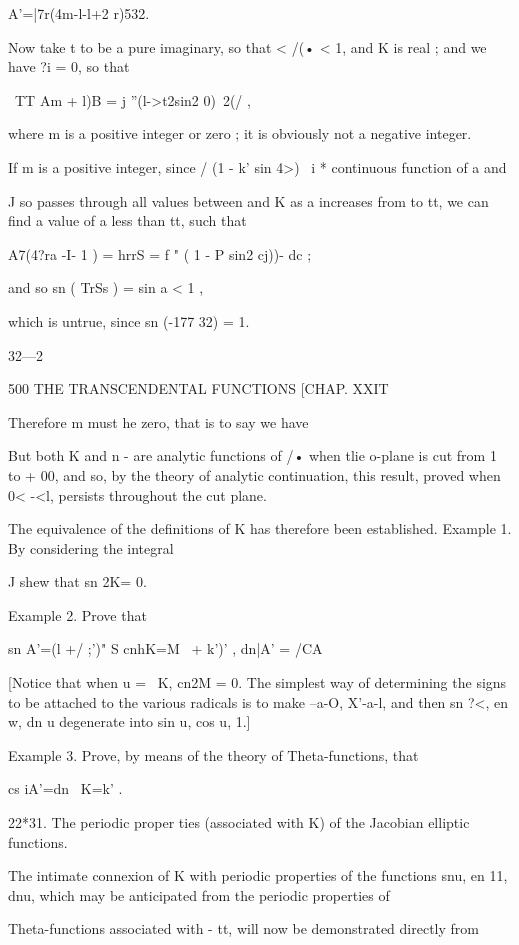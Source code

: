 A'=|7r(4m-l-l+2 r)532.

Now take t to be a pure imaginary, so that < /(• < 1, and K is real ;
and we have ?i = 0, so that

\ TT Am + l)B = j ''(l->t2sin2 0)~2(/ ,

where m is a positive integer or zero ; it is obviously not a negative
integer.

If m is a positive integer, since / (1 - k' sin 4>)~ i * continuous
function of a and

J so passes through all values between and K as a increases from to
tt, we can find a value of a less than tt, such that

A7(4?ra -I- 1 ) = hrrS = f " ( 1 - P sin2 cj))- dc ;

and so sn ( TrSs ) = sin a < 1 ,

which is untrue, since sn (-177 32) = 1.

32—2

500 THE TRANSCENDENTAL FUNCTIONS [CHAP. XXIT

Therefore m must he zero, that is to say we have

But both K and n - are analytic functions of /• when tlie o-plane is
cut from 1 to + 00, and so, by the theory of analytic continuation,
this result, proved when 0< -<l, persists throughout the cut plane.

The equivalence of the definitions of K has therefore been
established. Example 1. By considering the integral

J shew that sn 2K= 0.

Example 2. Prove that

sn A'=(l +/ ;')" S cnhK=M \ + k')' , dn|A' = /CA

[Notice that when u = \ K, cn2M = 0. The simplest way of determining
the signs to be attached to the various radicals is to make --a-O,
X'-a-l, and then sn ?<, en w, dn u degenerate into sin u, cos u, 1.]

Example 3. Prove, by means of the theory of Theta-functions, that

cs iA'=dn \ K=k' .

22*31. The periodic proper ties (associated with K) of the Jacobian
elliptic functions.

The intimate connexion of K with periodic properties of the functions
snu, en 11, dnu, which may be anticipated from the periodic properties
of

Theta-functions associated with - tt, will now be demonstrated
directly from


